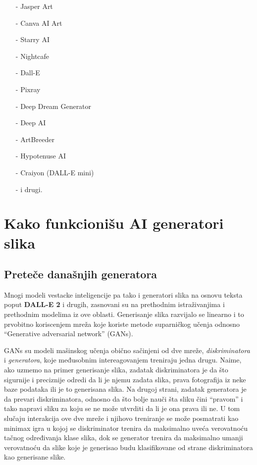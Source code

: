 \documentclass[12pt, letterpaper]{article}
\begin{document}
\begin{itemize} 

\item[-] Jasper Art 

\item[-] Canva AI Art 

\item[-] Starry AI 

\item[-] Nightcafe 

\item[-] Dall-E 

\item[-] Pixray 

\item[-] Deep Dream Generator 

\item[-] Deep AI 

\item[-] ArtBreeder 

\item[-] Hypotenuse AI 

\item[-] Craiyon (DALL-E mini) 

\item[-] i drugi. 

\end{itemize} 

\cite{kljucTri} 

\pagebreak
\section{Kako funkcionišu AI generatori slika}
\subsection*{Preteče današnjih generatora}
Mnogi modeli vestacke inteligencije pa tako i generatori slika na osnovu teksta poput \textbf{DALL-E 2} i drugih, zasnovani su na prethodnim istraživanjima i prethodnim modelima iz ove oblasti.
Generisanje slika razvijalo se linearno i to prvobitno koriscenjem mreža koje koriste metode suparničkog učenja odnosno “Generative adversarial network” (GANs).

GANs su modeli mašinskog učenja obično sačinjeni od dve mreže, \textit{diskriminatora} i \textit{generatora}, koje međusobnim intereagovanjem treniraju jedna drugu. Naime, ako uzmemo na primer generisanje slika, zadatak diskriminatora je da što sigurnije i preciznije odredi da li je njemu zadata slika, prava fotografija iz neke baze podataka ili je to generisana slika. Na drugoj strani, zadatak generatora je da prevari diskriminatora, odnosno da što bolje nauči šta sliku čini “pravom” i tako napravi sliku za koju se ne može utvrditi da li je ona prava ili ne. U tom slučaju interakcija ove dve mreže i njihovo treniranje se može posmatrati kao minimax igra u kojoj se diskriminator trenira da maksimalno uveća verovatnoću tačnog određivanja klase slika, dok se generator trenira da maksimalno umanji verovatnoću da slike koje je generisao budu klasifikovane od strane diskriminatora kao generisane slike.\cite{gan1, gan2, ganvideo}
\end{document}
